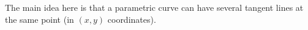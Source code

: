 \documentclass[]{ximera}
\begin{document}
\begin{instructorNotes}
The main idea here is that a parametric curve can have several tangent lines at the same point (in $(x,y)$ coordinates).
\end{instructorNotes}
















	
	
	
	
	
	
	
	
	

	










								
				
				
	
\end{document}
